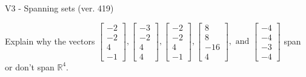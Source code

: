 \begin{exercise}
  \begin{exerciseTitle}V3 - Spanning sets (ver. 419)\end{exerciseTitle}
  \begin{exerciseStatement}
    Explain why the vectors \(\left[\begin{array}{r}
-2 \\
-2 \\
4 \\
-1
\end{array}\right] , \left[\begin{array}{r}
-3 \\
-2 \\
4 \\
4
\end{array}\right] , \left[\begin{array}{r}
-2 \\
-2 \\
4 \\
-1
\end{array}\right] , \left[\begin{array}{r}
8 \\
8 \\
-16 \\
4
\end{array}\right] , \text{ and } \left[\begin{array}{r}
-4 \\
-4 \\
-3 \\
-4
\end{array}\right]\) span or don't span \(\mathbb{R}^4\). 
	



\end{exerciseStatement}
\end{exercise}
